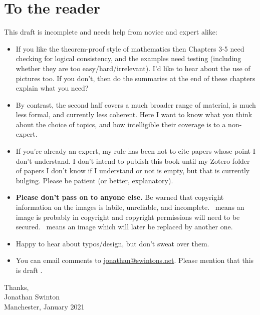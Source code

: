 
\thispagestyle{titlingpage}

\chapter*{To the reader}
This draft is incomplete and needs help from novice and expert alike:
\begin{itemize}
	\item If you like the theorem-proof style of mathematics then Chapters 3-5 need checking for logical consistency, and the examples need testing (including whether they are too easy/hard/irrelevant). I'd like to hear about the use of pictures too. If you don't, then do the summaries at the end of these chapters explain what you need?
	\item By contrast, the second half covers a much broader range of material, is much less formal, and currently less coherent. Here I want to know what you think about the choice of topics, and how intelligible their coverage is to a non-expert. 
	\item If you're already an expert, my rule has been not to cite papers whose point I don't understand. I don't intend to publish this book until my Zotero folder of papers I don't know if I understand or not is empty, but that is currently bulging. Please be patient (or better, explanatory).
\item \textbf{Please don't pass on to anyone else.} Be warned that copyright information on the images is labile, unreliable, and incomplete. 
 \copynote\ means an image is probably in copyright and copyright permissions will need to be secured. 
 \placenote\ means an image which will later be replaced by another one. 
 \item Happy to hear about typos/design, but don't sweat over them. 
 \item  You can email comments to \href{mailto:jonathan@swintons.net}{jonathan@swintons.net}. Please mention that this is draft \jdraftnumber.
 \end{itemize}

\noindent%
Thanks,\\
Jonathan Swinton\\
Manchester, January 2021\\
\clearpage



